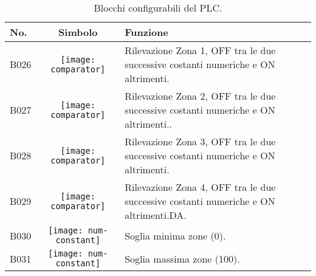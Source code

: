 \begin{table}[htbp]\centering
    \caption{Blocchi configurabili del PLC.}\label{tab:blocchi-plc}
    \begin{tabularx}{\columnwidth}{@{}lcX@{}}\toprule
        \textbf{No.} & \textbf{Simbolo}                           & \textbf{Funzione}                                                                    \\ \midrule
        B026         & \texttt{[image: comparator]}   & Rilevazione Zona 1, OFF tra le due successive costanti numeriche e ON altrimenti.    \\
        B027         & \texttt{[image: comparator]}   & Rilevazione Zona 2, OFF tra le due successive costanti numeriche e ON altrimenti..   \\
        B028         & \texttt{[image: comparator]}   & Rilevazione Zona 3, OFF tra le due successive costanti numeriche e ON altrimenti.    \\
        B029         & \texttt{[image: comparator]}   & Rilevazione Zona 4, OFF tra le due successive costanti numeriche e ON altrimenti.DA. \\
        B030         & \texttt{[image: num-constant]} & Soglia minima zone (0).                                                              \\
        B031         & \texttt{[image: num-constant]} & Soglia massima zone (100).                                                           \\
    \bottomrule\end{tabularx}
\end{table}

